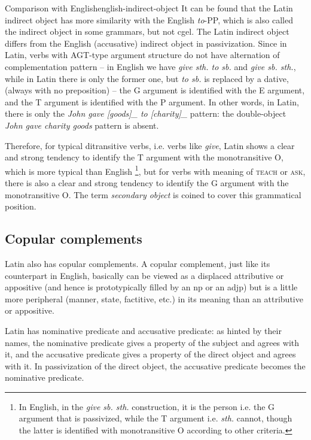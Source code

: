 \documentclass[a4paper, oneside]{report}
\newcommand*{\term}[1]{\emph{#1}}
\newcommand{\form}[1]{\emph{#1}}
\newcommand*{\category}[1]{\textsc{#1}}
\begin{document}
\begin{infobox}{Comparison with English}{english-indirect-object}
    It can be found that the Latin indirect object has more similarity with the English \form{to}-PP,
    which is also called the indirect object in some grammars, but not \ac{cgel}.
    The Latin indirect object differs from the English (accusative) indirect object in passivization.
    Since in Latin, verbs with AGT-type argument structure do not have alternation of complementation pattern
    -- in English we have \form{give sth. to sb.} and \form{give sb. sth.}, 
    while in Latin there is only the former one, but \form{to sb.} is replaced by a dative,
    (always with no preposition) --
    the G argument is identified with the E argument,
    and the T argument is identified with the P argument.
    In other words, in Latin, there is only 
    the \form{John gave [goods]_{} to [charity]_{}} pattern:
    the double-object \form{John gave charity goods} pattern is absent.
    
    Therefore, for typical ditransitive verbs, i.e. verbs like \form{give}, 
    Latin shows a clear and strong tendency to identify the T argument with the monotransitive O,
    which is more typical than English%
    \footnote{
        In English, in the \form{give sb. sth.} construction, it is the person i.e. the G argument that is passivized,
        while the T argument i.e. \form{sth.} cannot, though the latter is identified with monotransitive O
        according to other criteria. 
    },
    but for verbs with meaning of \category{teach} or \category{ask},
    there is also a clear and strong tendency to identify the G argument with the monotransitive O.
    The term \term{secondary object} is coined to cover this grammatical position.
\end{infobox}

\subsection{Copular complements}

Latin also has copular complements.
A copular complement, just like its counterpart in English,
basically can be viewed as a displaced attributive or appositive 
(and hence is prototypically filled by an \ac{np} or an \acs{adjp})
but is a little more peripheral (manner, state, factitive, etc.) 
in its meaning than an attributive or appositive.

Latin has nominative predicate and accusative predicate:
as hinted by their names, 
the nominative predicate gives a property of the subject and agrees with it,
and the accusative predicate gives a property of the direct object and agrees with it.
In passivization of the direct object,
the accusative predicate becomes the nominative predicate.
\end{document}
